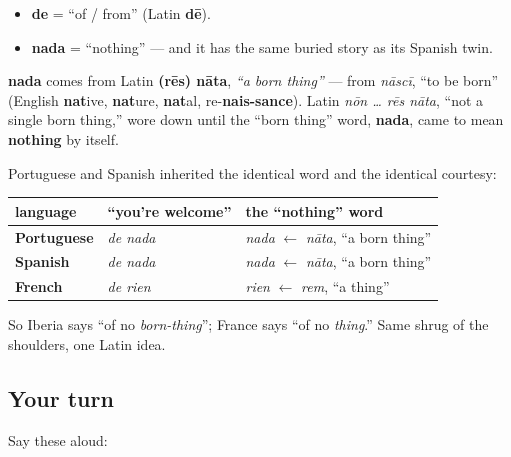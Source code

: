 \begin{cousinweb}
\begin{itemize}
\raggedright
  \item \textbf{de} = \textquotedblleft{}of / from\textquotedblright{} (Latin \textbf{dē}).
  \item \textbf{nada} = \textquotedblleft{}nothing\textquotedblright{} — and it has the same buried story as its Spanish twin.
\end{itemize}

\textbf{nada} comes from Latin \textbf{(rēs) nāta}, \emph{\textquotedblleft{}a born thing\textquotedblright{}} — from \emph{nāscī}, \textquotedblleft{}to be born\textquotedblright{} (English \textbf{nat}ive, \textbf{nat}ure, \textbf{nat}al, re-\textbf{nais-sance}). Latin \emph{nōn … rēs nāta}, \textquotedblleft{}not a single born thing,\textquotedblright{} wore down until the \textquotedblleft{}born thing\textquotedblright{} word, \textbf{nada}, came to mean \textbf{nothing} by itself.

Portuguese and Spanish inherited the identical word and the identical courtesy:

\noindent
\begin{tabularx}{\linewidth}{@{}>{\raggedright\arraybackslash}X>{\raggedright\arraybackslash}X>{\raggedright\arraybackslash}X@{}}
\toprule
\textbf{language} & \textbf{\textquotedblleft{}you're welcome\textquotedblright{}} & \textbf{the \textquotedblleft{}nothing\textquotedblright{} word} \\
\midrule
\textbf{Portuguese} & \emph{de nada} & \emph{nada} $\leftarrow$ \emph{nāta}, \textquotedblleft{}a born thing\textquotedblright{} \\
\textbf{Spanish} & \emph{de nada} & \emph{nada} $\leftarrow$ \emph{nāta}, \textquotedblleft{}a born thing\textquotedblright{} \\
\textbf{French} & \emph{de rien} & \emph{rien} $\leftarrow$ \emph{rem}, \textquotedblleft{}a thing\textquotedblright{} \\
\bottomrule
\end{tabularx}

So Iberia says \textquotedblleft{}of no \emph{born-thing}\textquotedblright{}; France says \textquotedblleft{}of no \emph{thing}.\textquotedblright{} Same shrug of the shoulders, one Latin idea.
\end{cousinweb}

\subsection*{Your turn}
Say these aloud:

